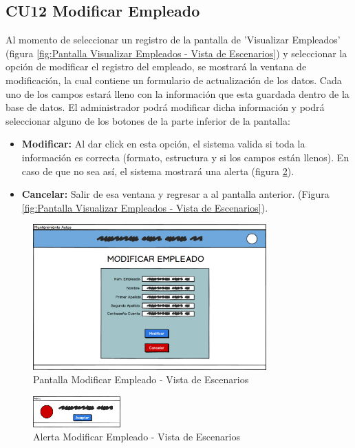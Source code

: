 \subsection{CU12 Modificar Empleado}
Al momento de seleccionar un registro de la pantalla de 'Visualizar Empleados' (figura \ref{fig:Pantalla Visualizar Empleados - Vista de Escenarios}) y seleccionar la opción de modificar el registro del empleado, se mostrará la ventana de modificación, la cual contiene un formulario de actualización de los datos. Cada uno de los campos estará lleno con la información que esta guardada dentro de la base de datos. El administrador podrá modificar dicha información y podrá seleccionar alguno de los botones de la parte inferior de la pantalla:
\begin{itemize}
	\item \textbf{Modificar:} Al dar click en esta opción, el sistema valida si toda la información es correcta (formato, estructura y si los campos están llenos). En caso de que no sea así, el sistema mostrará una alerta (figura \ref{fig:Alerta Modificar Empleado - Vista de Escenarios}).
	\item \textbf{Cancelar:} Salir de esa ventana y regresar a al pantalla anterior. (Figura \ref{fig:Pantalla Visualizar Empleados - Vista de Escenarios}).
\end{itemize}
\begin{figure}[!h]
	\centering
	\includegraphics[width=0.8\textwidth]{./diseno/vescenarios/imagenes/modificarEmpleado}
	\caption{Pantalla Modificar Empleado - Vista de Escenarios}
	\label{fig:Pantalla Modificar Empleado - Vista de Escenarios}
\end{figure}
\begin{figure}[!h]
	\centering
	\includegraphics[width=0.3\textwidth]{./diseno/vescenarios/imagenes/alerta}
	\caption{Alerta Modificar Empleado - Vista de Escenarios}
	\label{fig:Alerta Modificar Empleado - Vista de Escenarios}
\end{figure}
\clearpage